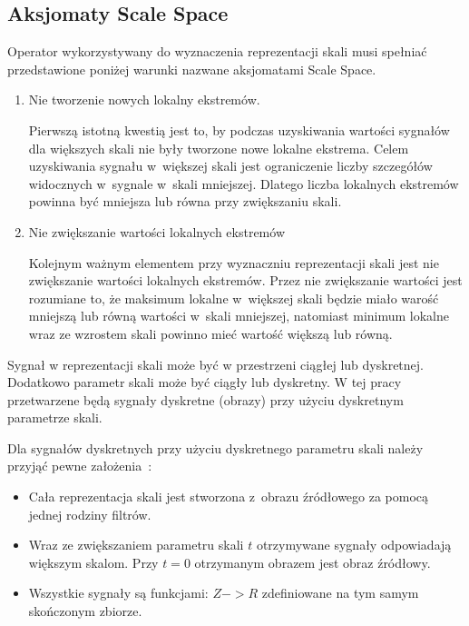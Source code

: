 \subsection{Aksjomaty Scale Space}
\label{subsec:aksjomaty}

Operator wykorzystywany do wyznaczenia reprezentacji skali musi spełniać przedstawione poniżej warunki nazwane aksjomatami Scale Space. 

\begin{enumerate}
\item Nie tworzenie nowych lokalny ekstremów.

Pierwszą istotną kwestią jest to, by podczas uzyskiwania wartości sygnałów dla większych skali nie były tworzone nowe lokalne ekstrema. Celem uzyskiwania sygnału w~większej skali jest ograniczenie liczby szczegółów widocznych w~sygnale w~skali mniejszej. Dlatego liczba lokalnych ekstremów powinna być mniejsza lub równa przy zwiększaniu skali.

\item Nie zwiększanie wartości lokalnych ekstremów

Kolejnym ważnym elementem przy wyznaczniu reprezentacji skali jest nie zwiększanie wartości lokalnych ekstremów. Przez nie zwiększanie wartości jest rozumiane to, że maksimum lokalne w~większej skali będzie miało warość mniejszą lub równą wartości w~skali mniejszej, natomiast minimum lokalne wraz ze wzrostem skali powinno mieć wartość większą lub równą.

\end{enumerate}

Sygnał w reprezentacji skali może być w przestrzeni ciągłej lub dyskretnej. Dodatkowo parametr skali może być ciągły lub dyskretny. W tej pracy przetwarzene będą sygnały dyskretne (obrazy) przy użyciu dyskretnym parametrze skali.

Dla sygnałów dyskretnych przy użyciu dyskretnego parametru skali należy przyjąć pewne założenia~\cite{SSFDS}:
\begin{itemize}
\item Cała reprezentacja skali jest stworzona z~obrazu źródłowego za pomocą jednej rodziny filtrów.
\item Wraz ze zwiększaniem parametru skali $ t $ otrzymywane sygnały odpowiadają większym skalom. Przy $ t = 0 $ otrzymanym obrazem jest obraz źródłowy.
\item Wszystkie sygnały są funkcjami: $ Z -> R $ zdefiniowane na tym samym skończonym zbiorze.
\end{itemize}


